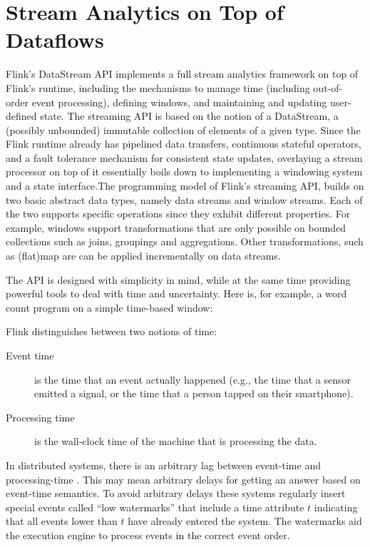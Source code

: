 
\section{Stream Analytics on Top of Dataflows}
\label{sec:windows}


Flink's DataStream API implements a full stream analytics framework on top of Flink's runtime, including the mechanisms to manage time (including out-of-order event processing), defining windows, and maintaining and updating user-defined state. The streaming API is based on the notion of a DataStream, a (possibly unbounded) immutable collection of elements of a given type. Since the Flink runtime already has pipelined data transfers, continuous stateful operators, and a fault tolerance mechanism for consistent state updates, overlaying a stream processor on top of it essentially boils down to implementing a windowing system and a state interface.The programming model of Flink's streaming API,  builds on two basic abstract data types, namely data streams and window streams. Each of the two supports specific operations since they exhibit different properties. For example, windows support transformations that are only possible on bounded collections such as joins, groupings and aggregations. Other transformations, such as (flat)map are  can be applied incrementally on data streams.

The API is designed with simplicity in mind, while at the same time providing powerful tools to deal with time and uncertainty. Here is, for example, a word count program on a simple  time-based window:



Flink distinguishes between two notions of time: 
\begin{description}
\item[Event time] is the time that an event actually happened (e.g., the time that a sensor emitted a signal, or the time that a person tapped on their smartphone).
\item[Processing time] is the wall-clock time of the machine that is processing the data.
\end{description}

In distributed systems, there is an arbitrary lag between event-time and processing-time \cite{akidau2015dataflow}. This may mean arbitrary delays for getting an answer based on event-time semantics. To avoid arbitrary delays these systems regularly insert special events called ``low watermarks''  that include a time attribute $t$ indicating that all events lower than $t$ have already entered the system. The watermarks aid the execution engine to process events in the correct event order. 

